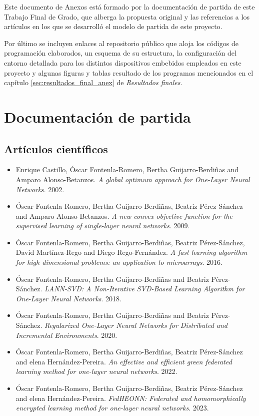 \documentclass[00-Trabajo_Final.tex]{subfiles}
\begin{document}
\renewcommand{\NombreDocumento}{Anexos}


\newpage

Este documento de Anexos está formado por la documentación de partida de este Trabajo Final de Grado, que alberga la propuesta original y las referencias a los artículos en los que se desarrolló el modelo de partida de este proyecto.

Por último se incluyen enlaces al repositorio público que aloja los códigos de programación elaborados, un esquema de su estructura, la configuración del entorno detallada para los distintos dispositivos embebidos empleados en este proyecto y algunas figuras y tablas resultado de los programas mencionados en el capítulo \ref{sec:resultados_final_anex} de \textit{Resultados finales}.

\section{Documentación de partida}

\vspace{1cm}

\subsection*{Artículos científicos}

\begin{itemize}[noitemsep, topsep=5pt]
    \item Enrique Castillo, Óscar Fontenla-Romero, Bertha Guijarro-Berdiñas and Amparo Alonso-Betanzos. \textit{A global optimum approach for One-Layer Neural Networks}. 2002.
    \item Óscar Fontenla-Romero, Bertha Guijarro-Berdiñas, Beatriz Pérez-Sánchez and Amparo Alonso-Betanzos. \textit{A new convex objective function for the supervised learning of single-layer neural networks}. 2009.
    \item Óscar Fontenla-Romero, Bertha Guijarro-Berdiñas, Beatriz Pérez-Sánchez, David Martínez-Rego and Diego Rego-Fernández. \textit{A fast learning algorithm for high dimensional problems: an application to microarrays}. 2016.
    \item Óscar Fontenla-Romero, Bertha Guijarro-Berdiñas and Beatriz Pérez-Sánchez. \textit{LANN-SVD: A Non-Iterative SVD-Based Learning Algorithm for One-Layer Neural Networks}. 2018.
    \item Óscar Fontenla-Romero, Bertha Guijarro-Berdiñas and Beatriz Pérez-Sánchez. \textit{Regularized One-Layer Neural Networks for Distributed and Incremental Environments}. 2020.
    \item Óscar Fontenla-Romero, Bertha Guijarro-Berdiñas, Beatriz Pérez-Sánchez and elena Hernández-Pereira. \textit{An effective and efficient green federated learning method for one-layer neural networks}. 2022.
    \item Óscar Fontenla-Romero, Bertha Guijarro-Berdiñas, Beatriz Pérez-Sánchez and elena Hernández-Pereira. \textit{FedHEONN: Federated and homomorphically encrypted learning method for one-layer neural networks}. 2023.
\end{itemize}
\end{document}
